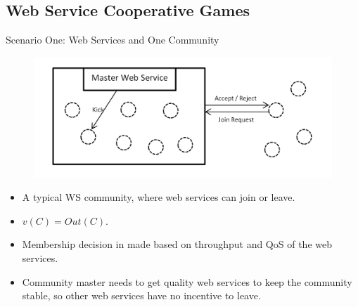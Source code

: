 \documentclass{beamer}
\begin{document}
\subsection{Web Service Cooperative Games}

\begin{frame}{Scenario One: Web Services and One Community}
    \begin{figure}[htbp]
        \centering
        \includegraphics[width=0.8 \columnwidth]{figures/scenario1.png}
    \end{figure}

    \begin{itemize}
        \item A typical WS community, where web services can join or leave.
        \item $v(C) = Out(C)$.
        \item Membership decision in made based on throughput and QoS of the web services.
        \item Community master needs to get quality web services to keep the community stable, so other web services have no incentive to leave.
    \end{itemize}
       	
\end{frame}
\end{document}
